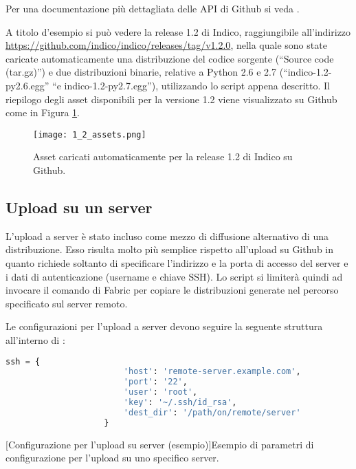             Per una documentazione più dettagliata delle \ac{API} di Github si veda \cite{github:api}.
            
            A titolo d'esempio si può vedere la release 1.2 di Indico, raggiungibile all'indirizzo \url{https://github.com/indico/indico/releases/tag/v1.2.0}, nella quale sono state caricate automaticamente una distribuzione del codice sorgente (``Source code (tar.gz)'') e due distribuzioni binarie, relative a Python 2.6 e 2.7 (``indico-1.2-py2.6.egg'' ``e indico-1.2-py2.7.egg''), utilizzando lo script appena descritto. Il riepilogo degli asset disponibili per la versione 1.2 viene visualizzato su Github come in Figura \ref{fig:1_2_asset}.
            
        	\begin{figure}[h!]
        		\begin{center}
        			\texttt{[image: 1\_2\_assets.png]}
        		\end{center}
        		\caption[Asset della release 1.2]{Asset caricati automaticamente per la release 1.2 di Indico su Github.}
        		\label{fig:1_2_asset}
        	\end{figure}
        
        \subsection{Upload su un server} \label{subsec:dp;ud;upload_server}
        
            L'upload a server è stato incluso come mezzo di diffusione alternativo di una distribuzione. Esso risulta molto più semplice rispetto all'upload su Github in quanto richiede soltanto di specificare l'indirizzo e la porta di accesso del server e i dati di autenticazione (username e chiave \ac{SSH}). Lo script si limiterà quindi ad invocare il comando  di Fabric per copiare le distribuzioni generate nel percorso specificato sul server remoto.
            
            Le configurazioni per l'upload a server devono seguire la seguente struttura all'interno di :
            
            \begin{center}
                \begin{lstlisting}[language=python, gobble=18]
                    ssh = {
                        'host': 'remote-server.example.com',
                        'port': '22',
                        'user': 'root',
                        'key': '~/.ssh/id_rsa',
                        'dest_dir': '/path/on/remote/server'
                    }
                \end{lstlisting}
                \captionsetup{textformat=empty,labelformat=empty} \vspace{-2em}
                [Configurazione per l'upload su server (esempio)]{Esempio di parametri di configurazione per l'upload su uno specifico server.}
            \end{center}
